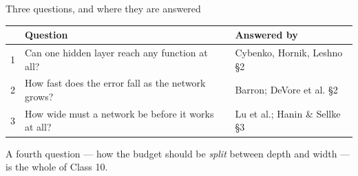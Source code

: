 \documentclass[aspectratio=169, 11pt]{beamer}
\newcommand{\nosrc}{}       %
\begin{document}
\begin{frame}{Three questions, and where they are answered}
  \nosrc
  \vspace{0.2em}
  \centering
  \renewcommand{\arraystretch}{1.35}
  {\small
  \begin{tabular}{p{} p{}
                  p{}}
    & \textbf{Question} & \textbf{Answered by}\\
    \hline
    1 & Can one hidden layer reach any function at all?
      & Cybenko, Hornik, Leshno \hfill{\scriptsize \S2}\\
    2 & How fast does the error fall as the network grows?
      & Barron; DeVore et al. \hfill{\scriptsize \S2}\\
    3 & How wide must a network be before it works at all?
      & Lu et al.; Hanin \& Sellke \hfill{\scriptsize \S3}\\
    \hline
  \end{tabular}}
  \vspace{0.7em}

  {\small A fourth question --- how the budget should be \emph{split}
  between depth and width --- is the whole of \alert{Class 10}.}
\end{frame}
\end{document}
